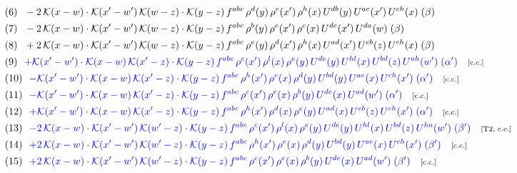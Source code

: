 \documentclass[9pt]{article}
\begin{document}
\begin{align}
&\quad\text{(6)}\ \ -2\, \mathcal{K}(x-w)\cdot \mathcal{K}(x'-w')\, \mathcal{K}(w-z) \cdot \mathcal{K}(y-z)\, f^{abc}\, \rho^{d}(y)\,\rho^{e}(x')\, \rho^{h}(x)\, U^{db}(y)\,U^{ae}(x')\,U^{ch}(x)\;(\beta)\notag\\
&\quad\text{(7)}\ \ -2\, \mathcal{K}(x-w)\cdot \mathcal{K}(x'-w')\, \mathcal{K}(w-z) \cdot \mathcal{K}(y-z)\, f^{abc}\, \rho^{b}(y)\,\rho^{e}(x')\, \rho^{c}(x)\, U^{de}(x')\,U^{da}(w)\;(\beta)\notag\\
&\quad\text{(8)}\ \ + 2\, \mathcal{K}(x-w)\cdot \mathcal{K}(x'-w')\, \mathcal{K}(w-z) \cdot \mathcal{K}(y-z)\, f^{abc}\, \rho^{e}(y)\,\rho^{d}(x')\, \rho^{h}(x)\, U^{ad}(x')\,U^{eb}(z)\,U^{ch}(x)\;(\beta)\notag\\
&\quad\text{(9)}\ \ \textcolor{blue}{+\mathcal{K}(x'-w')\cdot\mathcal{K}(x-w)\,\mathcal{K}(x'-z)\cdot\mathcal{K}(y-z)\, f^{abc}\,\rho^{c}(x')\,\rho^{l}(x)\,\rho^{e}(y)\,U^{de}(y)\,U^{hl}(x)\,U^{bd}(z)\,U^{ah}(w')\;(\alpha')}\quad\text{\scriptsize[c.c.]}\notag\\
&\quad\text{(10)}\ \ \textcolor{blue}{-\mathcal{K}(x'-w')\cdot\mathcal{K}(x-w)\,\mathcal{K}(x'-z)\cdot\mathcal{K}(y-z)\, f^{abc}\,\rho^{h}(x')\,\rho^{e}(x)\,\rho^{d}(y)\,U^{bd}(y)\,U^{ae}(x)\,U^{ch}(x')\;(\alpha')}\quad\text{\scriptsize[c.c.]}\notag\\
&\quad\text{(11)}\ \ \textcolor{blue}{-\mathcal{K}(x'-w')\cdot\mathcal{K}(x-w)\,\mathcal{K}(x'-z)\cdot\mathcal{K}(y-z)\, f^{abc}\,\rho^{c}(x')\,\rho^{e}(x)\,\rho^{b}(y)\,U^{de}(x)\,U^{ad}(w')\;(\alpha')}\quad\text{\scriptsize[c.c.]}\notag\\
&\quad\text{(12)}\ \ \textcolor{blue}{+\mathcal{K}(x'-w')\cdot\mathcal{K}(x-w)\,\mathcal{K}(x'-z)\cdot\mathcal{K}(y-z)\, f^{abc}\,\rho^{h}(x')\,\rho^{d}(x)\,\rho^{e}(y)\,U^{ad}(x)\,U^{eb}(z)\,U^{ch}(x')\;(\alpha')}\quad\text{\scriptsize[c.c.]}\notag\\
&\quad\text{(13)}\ \ \textcolor{blue}{-2\,\mathcal{K}(x-w)\cdot\mathcal{K}(x'-w')\,\mathcal{K}(w'-z)\cdot\mathcal{K}(y-z)\, f^{abc}\,\rho^{c}(x')\,\rho^{l}(x)\,\rho^{e}(y)\,U^{de}(y)\,U^{hl}(x)\,U^{bd}(z)\,U^{ha}(w')\;(\beta')}\quad\text{\scriptsize[T2, c.c.]}\notag\\
&\quad\text{(14)}\ \ \textcolor{blue}{+2\,\mathcal{K}(x-w)\cdot\mathcal{K}(x'-w')\,\mathcal{K}(w'-z)\cdot\mathcal{K}(y-z)\, f^{abc}\,\rho^{h}(x')\,\rho^{e}(x)\,\rho^{d}(y)\,U^{bd}(y)\,U^{ae}(x)\,U^{ch}(x')\;(\beta')}\quad\text{\scriptsize[c.c.]}\notag\\
&\quad\text{(15)}\ \ \textcolor{blue}{+2\,\mathcal{K}(x-w)\cdot\mathcal{K}(x'-w')\,\mathcal{K}(w'-z)\cdot\mathcal{K}(y-z)\, f^{abc}\,\rho^{c}(x')\,\rho^{e}(x)\,\rho^{b}(y)\,U^{de}(x)\,U^{ad}(w')\;(\beta')}\quad\text{\scriptsize[c.c.]}\notag\\

\end{align}
\end{document}
